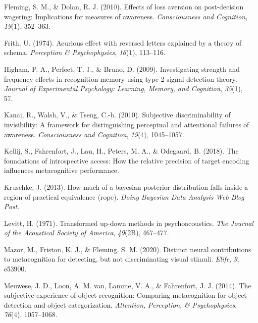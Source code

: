 \documentclass[
  english,
  man,floatsintext]{apa6}
\begin{document}
\leavevmode\hypertarget{ref-fleming2010effects}{}%
Fleming, S. M., \& Dolan, R. J. (2010). Effects of loss aversion on post-decision wagering: Implications for measures of awareness. \emph{Consciousness and Cognition}, \emph{19}(1), 352--363.

\leavevmode\hypertarget{ref-frith1974acurious}{}%
Frith, U. (1974). Acurious effect with reversed letters explained by a theory of schema. \emph{Perception \& Psychophysics}, \emph{16}(1), 113--116.

\leavevmode\hypertarget{ref-higham2009investigating}{}%
Higham, P. A., Perfect, T. J., \& Bruno, D. (2009). Investigating strength and frequency effects in recognition memory using type-2 signal detection theory. \emph{Journal of Experimental Psychology: Learning, Memory, and Cognition}, \emph{35}(1), 57.

\leavevmode\hypertarget{ref-kanai2010subjective}{}%
Kanai, R., Walsh, V., \& Tseng, C.-h. (2010). Subjective discriminability of invisibility: A framework for distinguishing perceptual and attentional failures of awareness. \emph{Consciousness and Cognition}, \emph{19}(4), 1045--1057.

\leavevmode\hypertarget{ref-kellij2018foundations}{}%
Kellij, S., Fahrenfort, J., Lau, H., Peters, M. A., \& Odegaard, B. (2018). The foundations of introspective access: How the relative precision of target encoding influences metacognitive performance.

\leavevmode\hypertarget{ref-kruschke2013much}{}%
Kruschke, J. (2013). How much of a bayesian posterior distribution falls inside a region of practical equivalence (rope). \emph{Doing Bayesian Data Analysis Web Blog Post}.

\leavevmode\hypertarget{ref-levitt1971transformed}{}%
Levitt, H. (1971). Transformed up-down methods in psychoacoustics. \emph{The Journal of the Acoustical Society of America}, \emph{49}(2B), 467--477.

\leavevmode\hypertarget{ref-mazor2020distinct}{}%
Mazor, M., Friston, K. J., \& Fleming, S. M. (2020). Distinct neural contributions to metacognition for detecting, but not discriminating visual stimuli. \emph{Elife}, \emph{9}, e53900.

\leavevmode\hypertarget{ref-meuwese2014subjective}{}%
Meuwese, J. D., Loon, A. M. van, Lamme, V. A., \& Fahrenfort, J. J. (2014). The subjective experience of object recognition: Comparing metacognition for object detection and object categorization. \emph{Attention, Perception, \& Psychophysics}, \emph{76}(4), 1057--1068.
\end{document}
